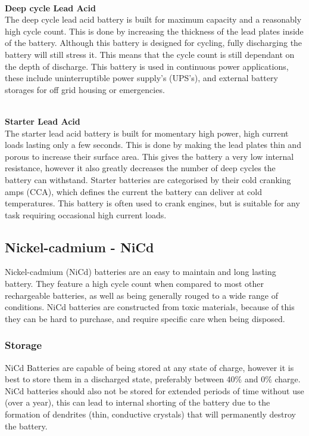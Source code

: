 \documentclass[a4paper,11pt]{article}
\begin{document}
\begin{multicols}{2}
\textbf{\\Deep cycle Lead Acid}\\
The deep cycle lead acid battery is built for maximum capacity and a reasonably high cycle count. This is done by increasing the thickness of the lead plates inside of the battery. Although this battery is designed for cycling, fully discharging the battery will still stress it. This means that the cycle count is still dependant on the depth of discharge. This battery is used in continuous power applications, these include uninterruptible power supply’s (UPS’s), and external battery storages for off grid housing or emergencies.

\textbf{\\Starter Lead Acid}\\
The starter lead acid battery is built for momentary high power, high current loads lasting only a few seconds. This is done by making the lead plates thin and porous to increase their surface area. This gives the battery a very low internal resistance, however it also greatly decreases the number of deep cycles the battery can withstand. Starter batteries are categorised by their cold cranking amps (CCA), which defines the current the battery can deliver at cold temperatures. This battery is often used to crank engines, but is suitable for any task requiring occasional high current loads.

\subsection{Nickel-cadmium - NiCd}

Nickel-cadmium (NiCd) batteries are an easy to maintain and long lasting battery. They feature a high cycle count when compared to most other rechargeable batteries, as well as being generally rouged to a wide range of conditions. NiCd batteries are constructed from toxic materials, because of this they can be hard to purchase, and require specific care when being disposed.

\subsubsection{Storage}

NiCd Batteries are capable of being stored at any state of charge, however it is best to store them in a discharged state, preferably between 40\% and 0\% charge. NiCd batteries should also not be stored for extended periods of time without use (over a year), this can lead to internal shorting of the battery due to the formation of dendrites (thin, conductive crystals) that will permanently destroy the battery\cite{dendrites}. 


\end{multicols}
\end{document}
